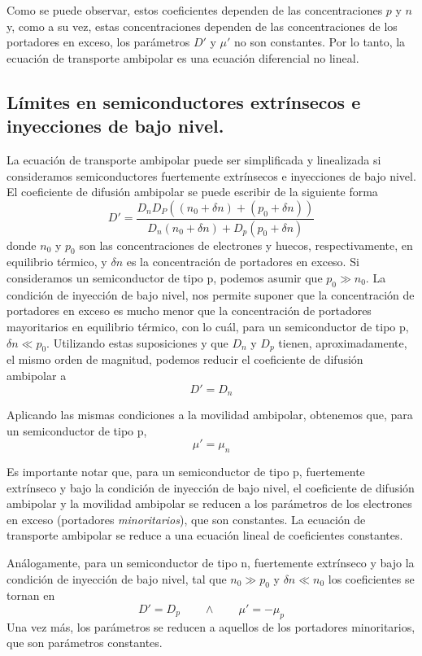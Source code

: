 \documentclass[12pt,a4paper]{article}
\begin{document}
Como se puede observar, estos coeficientes dependen de las concentraciones $p$ y $n$ y, como a su vez, estas concentraciones dependen de las concentraciones de los portadores en exceso, los parámetros $D'$ y $\mu '$ no son constantes. Por lo tanto, la ecuación de transporte ambipolar es una ecuación diferencial no lineal.

\subsection{Límites en semiconductores extrínsecos e inyecciones de bajo nivel.}

La ecuación de transporte ambipolar puede ser simplificada y linealizada si consideramos semiconductores fuertemente extrínsecos e inyecciones de bajo nivel. El coeficiente de difusión ambipolar se puede escribir de la siguiente forma
\[ D'=\frac{D_{n}D_{P}((n_{0}+\delta n)+(p_{0}+\delta n))}{D_{n}(n_{0}+\delta n)+D_{p}(p_{0}+\delta n)} \]
donde $n_{0}$ y $p_{0}$ son las concentraciones de electrones y huecos, respectivamente, en equilibrio térmico, y $\delta n$ es la concentración de portadores en exceso. Si consideramos un semiconductor de tipo p, podemos asumir que $p_{0} \gg n_{0}$. La condición de inyección de bajo nivel, nos permite suponer que la concentración de portadores en exceso es mucho menor que la concentración de portadores mayoritarios en equilibrio térmico, con lo cuál, para un semiconductor de tipo p, $\delta n \ll p_{0}$. Utilizando estas suposiciones y que $D_{n}$ y $D_{p}$ tienen, aproximadamente, el mismo orden de magnitud, podemos reducir el coeficiente de difusión ambipolar a
\[ D'=D_{n} \]

Aplicando las mismas condiciones a la movilidad ambipolar, obtenemos que, para un semiconductor de tipo p,
\[ \mu ' = \mu _{n} \]

Es importante notar que, para un semiconductor de tipo p, fuertemente extrínseco y bajo la condición de inyección de bajo nivel, el coeficiente de difusión ambipolar y la movilidad ambipolar se reducen a los parámetros de los electrones en exceso (portadores \emph{minoritarios}), que son constantes. La ecuación de transporte ambipolar se reduce a una ecuación lineal de coeficientes constantes.

Análogamente, para un semiconductor de tipo n, fuertemente extrínseco y bajo la condición de inyección de bajo nivel, tal que $n_{0} \gg p_{0}$ y $\delta n \ll n_{0}$ los coeficientes se tornan en
\[ D' = D_{p} \qquad \wedge \qquad \mu ' = - \mu _{p} \]
Una vez más, los parámetros se reducen a aquellos de los portadores minoritarios, que son parámetros constantes.
\end{document}
